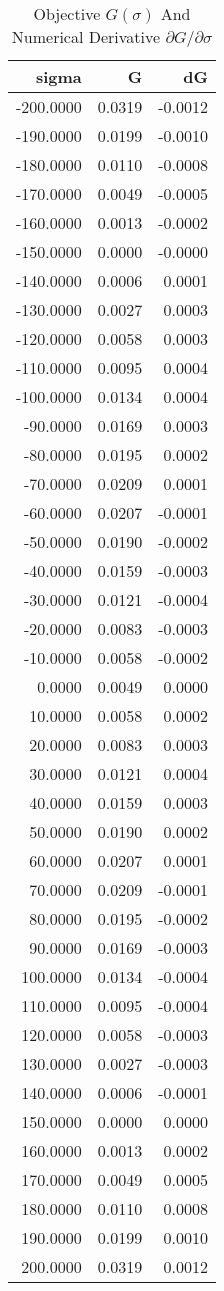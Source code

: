 \begin{table}[htbp]
    \centering
    \caption{Objective $G(\sigma)$ And Numerical Derivative $\partial G/\partial \sigma$}
    \label{tab:q7_Gsigma}
\toprule
\begin{tabular}{rrr}
\toprule
sigma & G & dG \\
\midrule
\midrule
-200.0000 & 0.0319 & -0.0012 \\
-190.0000 & 0.0199 & -0.0010 \\
-180.0000 & 0.0110 & -0.0008 \\
-170.0000 & 0.0049 & -0.0005 \\
-160.0000 & 0.0013 & -0.0002 \\
-150.0000 & 0.0000 & -0.0000 \\
-140.0000 & 0.0006 & 0.0001 \\
-130.0000 & 0.0027 & 0.0003 \\
-120.0000 & 0.0058 & 0.0003 \\
-110.0000 & 0.0095 & 0.0004 \\
-100.0000 & 0.0134 & 0.0004 \\
-90.0000 & 0.0169 & 0.0003 \\
-80.0000 & 0.0195 & 0.0002 \\
-70.0000 & 0.0209 & 0.0001 \\
-60.0000 & 0.0207 & -0.0001 \\
-50.0000 & 0.0190 & -0.0002 \\
-40.0000 & 0.0159 & -0.0003 \\
-30.0000 & 0.0121 & -0.0004 \\
-20.0000 & 0.0083 & -0.0003 \\
-10.0000 & 0.0058 & -0.0002 \\
0.0000 & 0.0049 & 0.0000 \\
10.0000 & 0.0058 & 0.0002 \\
20.0000 & 0.0083 & 0.0003 \\
30.0000 & 0.0121 & 0.0004 \\
40.0000 & 0.0159 & 0.0003 \\
50.0000 & 0.0190 & 0.0002 \\
60.0000 & 0.0207 & 0.0001 \\
70.0000 & 0.0209 & -0.0001 \\
80.0000 & 0.0195 & -0.0002 \\
90.0000 & 0.0169 & -0.0003 \\
100.0000 & 0.0134 & -0.0004 \\
110.0000 & 0.0095 & -0.0004 \\
120.0000 & 0.0058 & -0.0003 \\
130.0000 & 0.0027 & -0.0003 \\
140.0000 & 0.0006 & -0.0001 \\
150.0000 & 0.0000 & 0.0000 \\
160.0000 & 0.0013 & 0.0002 \\
170.0000 & 0.0049 & 0.0005 \\
180.0000 & 0.0110 & 0.0008 \\
190.0000 & 0.0199 & 0.0010 \\
200.0000 & 0.0319 & 0.0012 \\
\bottomrule
\bottomrule
\end{tabular}

\end{table}
